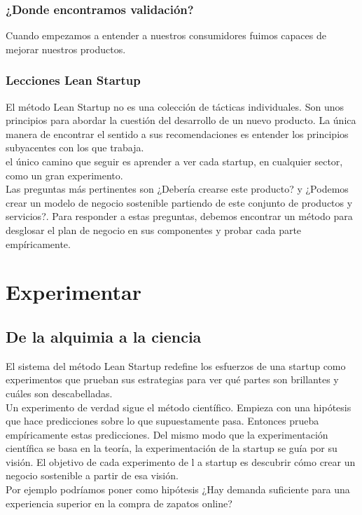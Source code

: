 \documentclass[10pt]{article}
\begin{document}
\begin{multicols}{2}
\subsubsection*{¿Donde encontramos validación?}
Cuando empezamos a entender a nuestros consumidores fuimos capaces de mejorar nuestros productos.
\subsubsection*{Lecciones Lean Startup}
El método Lean Startup no es una colección de tácticas individuales. Son unos principios para abordar la cuestión del desarrollo de un nuevo producto. La única manera de encontrar el sentido a sus recomendaciones es entender los principios subyacentes con los que trabaja.\\
{\color{blue}el único camino que seguir es aprender a ver cada startup, en cualquier sector, como un gran experimento.}\\
Las preguntas más pertinentes son ¿Debería crearse este producto? y ¿Podemos crear un modelo de negocio sostenible partiendo de este conjunto de productos y servicios?. Para responder a estas preguntas, debemos encontrar un método para desglosar el plan de negocio en sus componentes y probar cada parte empíricamente.
\section*{Experimentar}
\subsection*{De la alquimia a la ciencia}
El sistema del método Lean Startup redefine los esfuerzos de una startup como experimentos que prueban sus estrategias para ver qué partes son brillantes y cuáles son descabelladas.\\
{\color{blue}Un experimento de verdad sigue el método científico.}
{\color{blue}Empieza con una hipótesis que hace predicciones sobre lo que supuestamente pasa. Entonces prueba empíricamente estas predicciones. Del mismo modo que la experimentación científica se basa en la teoría, la experimentación de la startup se guía por su visión. El objetivo de cada experimento de l a startup es descubrir cómo crear un negocio sostenible a partir de esa visión.}\\
Por ejemplo podríamos poner como hipótesis ¿Hay demanda suficiente para una experiencia superior en la compra de zapatos online?

\end{multicols}
\end{document}
